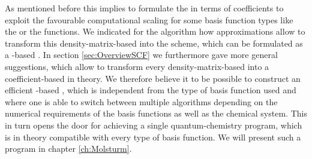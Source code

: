 As mentioned before this implies to formulate the \SCF in terms of coefficients
to exploit the favourable computational scaling
for some basis function types like the \FE or the \CS functions.
We indicated for the \ODA algorithm
how approximations allow to transform this density-matrix-based
\SCF into the \tODA scheme,
which can be formulated as a \contraction-based \SCF.
In section \vref{sec:OverviewSCF} we furthermore gave more general suggestions,
which allow to transform every density-matrix-based \SCF
into a coefficient-based \SCF in theory.
We therefore believe it to be possible
to construct an efficient \contraction-based \SCF,
which is independent from the type of basis function used
and where one is able to switch between
multiple algorithms depending on the numerical requirements of the basis functions
as well as the chemical system.
This in turn opens the door
for achieving a single quantum-chemistry program,
which is in theory compatible with every type of basis function.
We will present such a program in chapter \ref{ch:Molsturm}.
